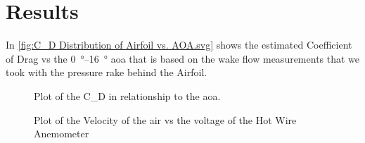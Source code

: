 \chapter{Results}
\label{cp:results}


 In \autoref{fig:C_D Distribution of Airfoil vs. AOA.svg} shows the estimated Coefficient of Drag vs the \qtyrange{0}{16}{\degree} \acrshort{aoa} that is based on the wake flow measurements that we took with the pressure rake behind the Airfoil. 

\begin{figure}[htpb]
    \centering
    
    \caption[Plot of the \gls{C_D} in relationship to the \acrshort{aoa}.]{Plot of the \gls{C_D} in relationship to the \acrshort{aoa}.}
    \label{fig:C_D Distribution of Airfoil vs. AOA.svg}
\end{figure}

\begin{figure}[htpb]
    \centering
    
    \caption[Plot of the Velocity of the air vs the voltage of the  Hot Wire Anemometer]{Plot of the Velocity of the air vs the voltage of the  Hot Wire Anemometer}
    \label{fig: Velocity vs. Voltage.svg}
\end{figure}
